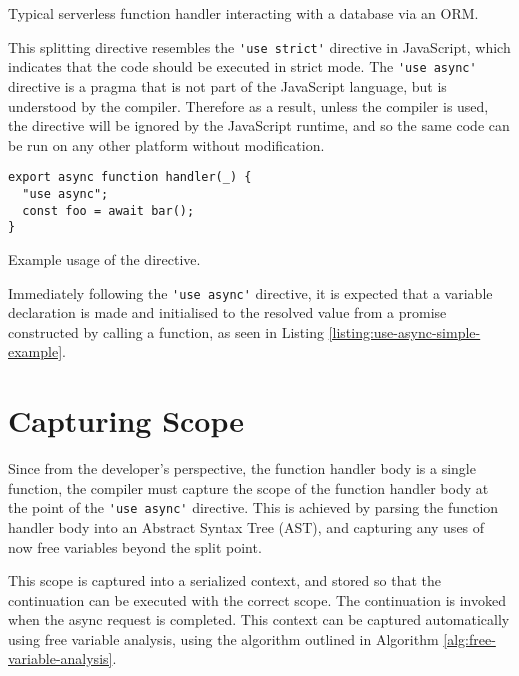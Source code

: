 \begin{listing}[H]
  \inputminted{javascript}{node_modules/@faaas-bench/hello-seq/src/onHttpGetHello.trigger.ts}
  \caption{Typical serverless function handler interacting with a database via an ORM.}
\end{listing}

This splitting directive resembles the \verb|'use strict'| directive in JavaScript, which indicates that the code should be executed in strict mode. The \verb|'use async'| directive is a pragma that is not part of the JavaScript language, but is understood by the \faaasc{} compiler. Therefore as a result, unless the \faaasc{} compiler is used, the directive will be ignored by the JavaScript runtime, and so the same code can be run on any other \faas{} platform without modification.

\begin{listing}[H]
\begin{verbatim}
export async function handler(_) {
  "use async";
  const foo = await bar();
}
\end{verbatim}
\caption{Example usage of the directive.}
\label{listing:use-async-simple-example}
\end{listing}

Immediately following the \verb|'use async'| directive, it is expected that a variable declaration is made and initialised to the resolved value from a promise constructed by calling a function, as seen in Listing \ref{listing:use-async-simple-example}.

\section{Capturing Scope}
Since from the developer's perspective, the function handler body is a single function, the \faaasc{} compiler must capture the scope of the function handler body at the point of the \verb|'use async'| directive. This is achieved by parsing the function handler body into an Abstract Syntax Tree (AST), and capturing any uses of now free variables beyond the split point.

This scope is captured into a serialized context, and stored so that the continuation can be executed with the correct scope. The continuation is invoked when the async request is completed. This context can be captured automatically using free variable analysis, using the algorithm outlined in Algorithm \ref{alg:free-variable-analysis}.

